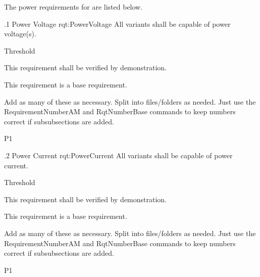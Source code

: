 The power requirements for \ThisSystem are listed below.

\ONERQMTVKPP
{\RqtNumberBase.1}
{Power Voltage}
{rqt:PowerVoltage}
{All \ThisSys variants shall be capable of \TBD power voltage(s).}
{
	\item [Phase 1] Threshold
}
{This requirement shall be verified by demonstration.}
{
	\item [N/A] This requirement is a base requirement.
}
{
  \item Add as many of these as necessary.  Split into files/folders as needed. Just use the RequirementNumberAM and RqtNumberBase commands to keep numbers correct if subsubsections are added.
}
{P1}

\ONERQMTVKPP
{\RqtNumberBase.2}
{Power Current}
{rqt:PowerCurrent}
{All \ThisSys variants shall be capable of \TBD power current.}
{
	\item [Phase 1] Threshold
}
{This requirement shall be verified by demonstration.}
{
	\item [N/A] This requirement is a base requirement.
}
{
  \item Add as many of these as necessary.  Split into files/folders as needed. Just use the RequirementNumberAM and RqtNumberBase commands to keep numbers correct if subsubsections are added.
}
{P1}
